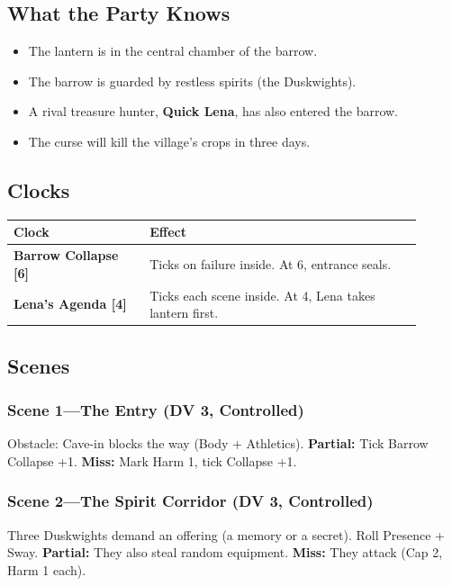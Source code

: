 \documentclass[10pt]{article}
\begin{document}
\subsection{What the Party Knows}
\begin{itemize}[leftmargin=*]
    \item The lantern is in the central chamber of the barrow.
    \item The barrow is guarded by restless spirits (the Duskwights).
    \item A rival treasure hunter, \textbf{Quick Lena}, has also entered the barrow.
    \item The curse will kill the village's crops in three days.
\end{itemize}

\subsection{Clocks}
\begin{coretable}
\begin{tabular}{>{\bfseries}p{0.3\linewidth} p{0.6\linewidth}}
\toprule
\textbf{Clock} & \textbf{Effect} \\
\midrule
Barrow Collapse [6] & Ticks on failure inside. At 6, entrance seals. \\
Lena's Agenda [4] & Ticks each scene inside. At 4, Lena takes lantern first. \\
\bottomrule
\end{tabular}
\end{coretable}

\subsection{Scenes}
\subsubsection{Scene 1—The Entry (DV 3, Controlled)}
Obstacle: Cave-in blocks the way (Body + Athletics). \textbf{Partial:} Tick Barrow Collapse +1. \textbf{Miss:} Mark Harm 1, tick Collapse +1.

\subsubsection{Scene 2—The Spirit Corridor (DV 3, Controlled)}
Three Duskwights demand an offering (a memory or a secret). Roll Presence + Sway. \textbf{Partial:} They also steal random equipment. \textbf{Miss:} They attack (Cap 2, Harm 1 each).
\end{document}
